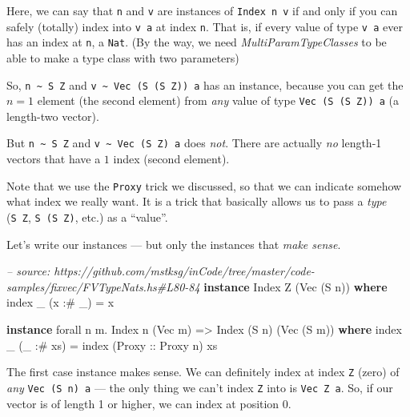 \documentclass[]{article}
\newenvironment{Shaded}{}{}
\newcommand{\KeywordTok}[1]{\textcolor[rgb]{0.00,0.44,0.13}{\textbf{{#1}}}}
\newcommand{\DataTypeTok}[1]{\textcolor[rgb]{0.56,0.13,0.00}{{#1}}}
\newcommand{\CommentTok}[1]{\textcolor[rgb]{0.38,0.63,0.69}{\textit{{#1}}}}
\newcommand{\OtherTok}[1]{\textcolor[rgb]{0.00,0.44,0.13}{{#1}}}
\newcommand{\FunctionTok}[1]{\textcolor[rgb]{0.02,0.16,0.49}{{#1}}}
\newcommand{\NormalTok}[1]{{#1}}
\begin{document}
Here, we can say that \texttt{n} and \texttt{v} are instances of
\texttt{Index\ n\ v} if and only if you can safely (totally) index into
\texttt{v\ a} at index \texttt{n}. That is, if every value of type \texttt{v\ a}
ever has an index at \texttt{n}, a \texttt{Nat}. (By the way, we need
\emph{MultiParamTypeClasses} to be able to make a type class with two
parameters)

So, \texttt{n\ \textasciitilde{}\ S\ Z} and
\texttt{v\ \textasciitilde{}\ Vec\ (S\ (S\ Z))\ a} has an instance, because you
can get the \(n = 1\) element (the second element) from \emph{any} value of type
\texttt{Vec\ (S\ (S\ Z))\ a} (a length-two vector).

But \texttt{n\ \textasciitilde{}\ S\ Z} and
\texttt{v\ \textasciitilde{}\ Vec\ (S\ Z)\ a} does \emph{not}. There are
actually \emph{no} length-1 vectors that have a \(1\) index (second element).

Note that we use the \texttt{Proxy} trick we discussed, so that we can indicate
somehow what index we really want. It is a trick that basically allows us to
pass a \emph{type} (\texttt{S\ Z}, \texttt{S\ (S\ Z)}, etc.) as a ``value''.

Let's write our instances --- but only the instances that \emph{make sense}.

\begin{Shaded}
\begin{Highlighting}[]
\CommentTok{-- source: https://github.com/mstksg/inCode/tree/master/code-samples/fixvec/FVTypeNats.hs#L80-84}
\KeywordTok{instance} \DataTypeTok{Index} \DataTypeTok{Z} \NormalTok{(}\DataTypeTok{Vec} \NormalTok{(}\DataTypeTok{S} \NormalTok{n)) }\KeywordTok{where}
    \NormalTok{index _ (x }\FunctionTok{:#} \NormalTok{_) }\FunctionTok{=} \NormalTok{x}

\KeywordTok{instance} \NormalTok{forall n m}\FunctionTok{.} \DataTypeTok{Index} \NormalTok{n (}\DataTypeTok{Vec} \NormalTok{m) }\OtherTok{=>} \DataTypeTok{Index} \NormalTok{(}\DataTypeTok{S} \NormalTok{n) (}\DataTypeTok{Vec} \NormalTok{(}\DataTypeTok{S} \NormalTok{m)) }\KeywordTok{where}
    \NormalTok{index _ (_ }\FunctionTok{:#} \NormalTok{xs) }\FunctionTok{=} \NormalTok{index (}\DataTypeTok{Proxy}\OtherTok{ ::} \DataTypeTok{Proxy} \NormalTok{n) xs}
\end{Highlighting}
\end{Shaded}

The first case instance makes sense. We can definitely index at index \texttt{Z}
(zero) of \emph{any} \texttt{Vec\ (S\ n)\ a} --- the only thing we can't index
\texttt{Z} into is \texttt{Vec\ Z\ a}. So, if our vector is of length 1 or
higher, we can index at position 0.
\end{document}
